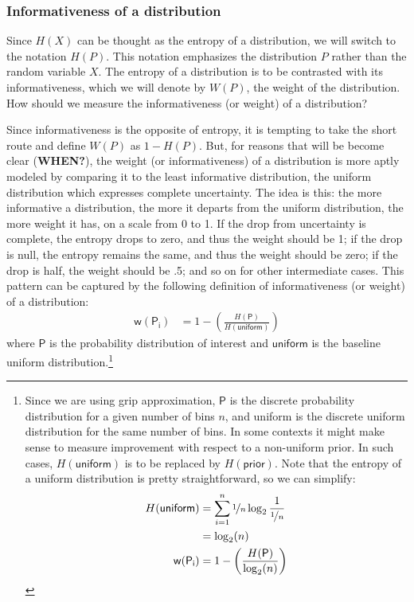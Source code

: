 \documentclass[
  10pt,
  dvipsnames,enabledeprecatedfontcommands]{scrartcl}
\begin{document}
\hypertarget{informativeness-of-a-distribution}{%
\subsubsection{Informativeness of a
distribution}\label{informativeness-of-a-distribution}}

Since \(H(X)\) can be thought as the entropy of a distribution, we will
switch to the notation \(H(P)\). This notation emphasizes the
distribution \(P\) rather than the random variable \(X\). The entropy of
a distribution is to be contrasted with its informativeness, which we
will denote by \(W(P)\), the weight of the distribution. How should we
measure the informativeness (or weight) of a distribution?

Since informativeness is the opposite of entropy, it is tempting to take
the short route and define \(W(P)\) as \(1-H(P)\). But, for reasons that
will be become clear (\textbf{WHEN?}), the weight (or informativeness)
of a distribution is more aptly modeled by comparing it to the least
informative distribution, the uniform distribution which expresses
complete uncertainty. The idea is this: the more informative a
distribution, the more it departs from the uniform distribution, the
more weight it has, on a scale from 0 to 1. If the drop from uncertainty
is complete, the entropy drops to zero, and thus the weight should be 1;
if the drop is null, the entropy remains the same, and thus the weight
should be zero; if the drop is half, the weight should be .5; and so on
for other intermediate cases. This pattern can be captured by the
following definition of informativeness (or weight) of a distribution:
\begin{align*}
\mathsf{w(P_i)} & = 1 - \left( \frac{H(\mathsf{P})}{H(\mathsf{uniform})}\right)
\end{align*} \noindent where \(\mathsf{P}\) is the probability
distribution of interest and \(\mathsf{uniform}\) is the baseline
uniform distribution.\footnote{Since we are using grip approximation,
  \(\mathsf{P}\) is the discrete probability distribution for a given
  number of bins \(n\), and uniform is the discrete uniform distribution
  for the same number of bins. In some contexts it might make sense to
  measure improvement with respect to a non-uniform prior. In such
  cases, \(H(\mathsf{uniform})\) is to be replaced by
  \(H(\mathsf{prior})\). Note that the entropy of a uniform distribution
  is pretty straightforward, so we can simplify: \begin{align*}
  H(\mathsf{uniform}) & = \sum_{i=1}^n \nicefrac{1}{n} \log_2 \frac{1}{\nicefrac{1}{n}} \\
  & = \log_2(n) \\
  \mathsf{w(P_i)} & = 1 - \left( \frac{H(\mathsf{P})}{\log_2(n)}\right)
  \end{align*}}
\end{document}
